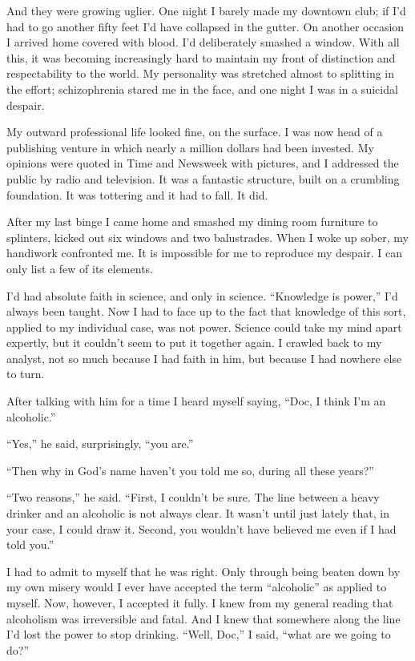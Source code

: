 And they were growing uglier. One night I barely made my downtown club; if I’d had to go another fifty feet I’d have collapsed in the gutter. On another occasion I arrived home covered with blood. I’d deliberately smashed a window. With all this, it was becoming increasingly hard to maintain my front of distinction and respectability to the world. My personality was stretched almost to splitting in the effort; schizophrenia stared me in the face, and one night I was in a suicidal despair.

My outward professional life looked fine, on the surface. I was now head of a publishing venture in which nearly a million dollars had been invested. My opinions were quoted in Time and Newsweek with pictures, and I addressed the public by radio and television. It was a fantastic structure, built on a crumbling foundation. It was tottering and it had to fall. It did.

After my last binge I came home and smashed my dining room furniture to splinters, kicked out six windows and two balustrades. When I woke up sober, my handiwork confronted me. It is impossible for me to reproduce my despair. I can only list a few of its elements.

I’d had absolute faith in science, and only in science. “Knowledge is power,” I’d always been taught. Now I had to face up to the fact that knowledge of this sort, applied to my individual case, was not power. Science could take my mind apart expertly, but it couldn’t seem to put it together again. I crawled back to my analyst, not so much because I had faith in him, but because I had nowhere else to turn.

       After talking with him for a time I heard myself saying, “Doc, I think I’m an alcoholic.”

“Yes,” he said, surprisingly, “you are.”

“Then why in God’s name haven’t you told me so, during all these years?”

“Two reasons,” he said. “First, I couldn’t be sure. The line between a heavy drinker and an alcoholic is not always clear. It wasn’t until just lately that, in your case, I could draw it. Second, you wouldn’t have believed me even if I had told you.”

I had to admit to myself that he was right. Only through being beaten down by my own misery would I ever have accepted the term “alcoholic” as applied to myself. Now, however, I accepted it fully. I knew from my general reading that alcoholism was irreversible and fatal. And I knew that somewhere along the line I’d lost the power to stop drinking. “Well, Doc,” I said, “what are we going to do?”

